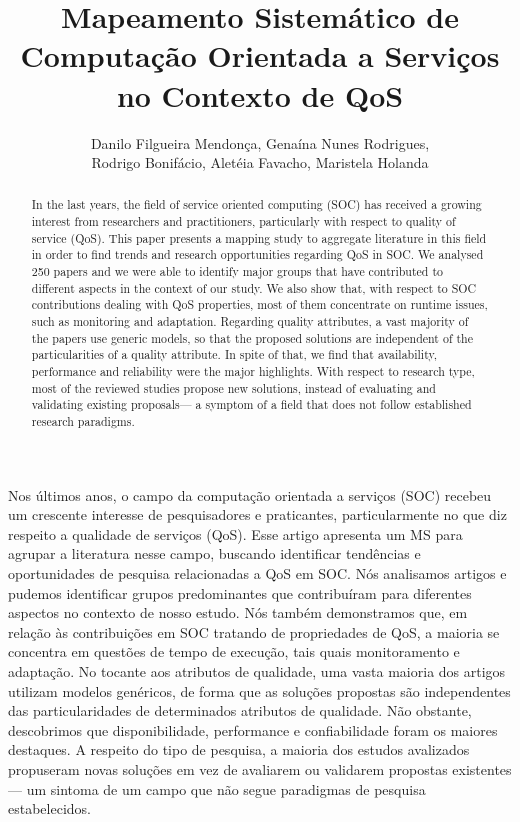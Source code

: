 \documentclass[12pt]{article}
\title{Mapeamento Sistem\'{a}tico de Computa\c{c}\~{a}o Orientada a Servi\c{c}os no Contexto de QoS}
\author{Danilo Filgueira Mendon\c{c}a\inst{1}, Gena\'{i}na Nunes Rodrigues\inst{1}, \\ Rodrigo Bonif\'{a}cio\inst{1}, Alet\'{e}ia Favacho\inst{1}, Maristela Holanda\inst{1} }
\begin{document}
 



\maketitle

\begin{abstract}

  In the last years, the field of service oriented computing (SOC) has received a growing interest from researchers and practitioners, particularly with respect to quality of service (QoS). This paper presents a mapping study to aggregate literature in this field in order to find trends and research opportunities regarding QoS in SOC. We analysed 250 papers and we were able to identify major groups that have contributed to different aspects in the context of our study. We also show that, with respect to SOC contributions dealing with QoS properties, most of them concentrate on runtime issues, such as monitoring and adaptation. Regarding quality attributes, a vast majority of the papers use generic models, so that the proposed solutions are independent of the particularities of a quality attribute. In spite of that, we find that availability, performance and reliability were the major highlights. With respect to research type, most of the reviewed studies propose new solutions, instead of evaluating and validating existing proposals--- a symptom of a field that does not follow established research paradigms.
\end{abstract}

\begin{resumo}
  Nos últimos anos, o campo da computação orientada a serviços (SOC) recebeu um crescente interesse de pesquisadores e praticantes, particularmente no que diz respeito a qualidade de serviços (QoS). Esse artigo apresenta um MS para agrupar a literatura nesse campo, buscando  identificar tendências e oportunidades de pesquisa relacionadas a QoS em SOC. Nós analisamos \AcceptedPubs artigos e pudemos identificar grupos predominantes que contribuíram para diferentes aspectos no contexto de nosso estudo. Nós também demonstramos que, em relação às contribuições em SOC tratando de propriedades de QoS, a maioria se concentra em questões de tempo de execução, tais quais monitoramento e adaptação. No tocante aos atributos de qualidade, uma vasta maioria dos artigos utilizam modelos genéricos, de forma que as soluções propostas são independentes das particularidades de determinados atributos de qualidade. Não obstante, descobrimos que disponibilidade, performance e confiabilidade foram os maiores destaques. A respeito do tipo de pesquisa, a maioria dos estudos avalizados propuseram novas soluções em vez de avaliarem ou validarem propostas existentes --- um sintoma de um campo que não segue paradigmas de pesquisa estabelecidos.
  
\end{resumo}



    











\end{document}
